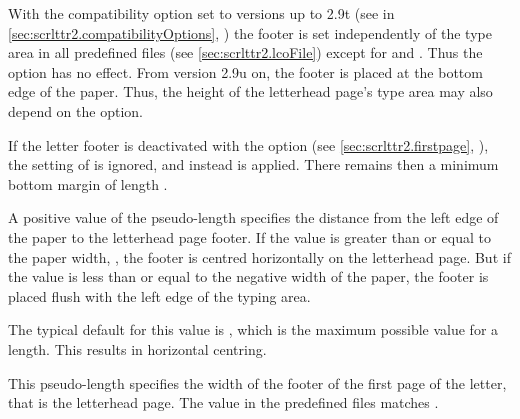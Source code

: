 With the compatibility option
set to versions up to
2.9t (see
 in
\autoref{sec:scrlttr2.compatibilityOptions},
) the footer is set independently of the
type area in all predefined  files (see \autoref{sec:scrlttr2.lcoFile})
except for  and . Thus the
%
 option has no effect.
From version 2.9u on, the footer is placed at the bottom edge of the paper.
Thus, the height of the letterhead page's type area may also depend on the
 option.

If the letter footer is deactivated with the
%
%
option (see \autoref{sec:scrlttr2.firstpage},
), the setting of
 is ignored, and instead
 is applied. There remains then a
minimum bottom margin of length .%
\EndIndexGroup


\begin{Declaration}
\end{Declaration}
%
A positive value of the 
pseudo-length specifies the distance from the left edge of the paper to the
letterhead page footer. If the value is greater than or equal to the paper
width, , the footer is centred
horizontally on the letterhead page. But if the value is less than or equal to
the negative width of the paper, the footer is placed flush with the left edge
of the typing area.

The typical default for this value is ,
which is the maximum possible value for a length. This results in horizontal
centring.%
\EndIndexGroup


\begin{Declaration}
\end{Declaration}
This pseudo-length specifies the width of the footer of the first page of the
letter, that is the letterhead page. The value in the predefined 
files matches
%
.%
%
\EndIndexGroup
%
\EndIndexGroup
%
\EndIndexGroup


